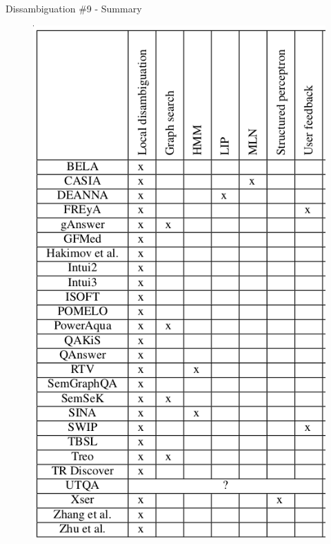 \documentclass{beamer}
\begin{document}
\note{}

\begin{frame}{Dissambiguation \#9 - Summary}
  \begin{cardTiny}
    \begin{figure}\label{fig:diss_table}
      \centering
      \includegraphics[height=0.8\textheight]{./res/diss_table.png}
    \end{figure}
  \end{cardTiny}
\end{frame}

\note{}
\end{document}
